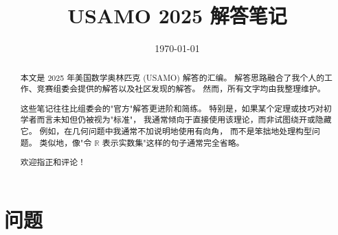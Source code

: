\documentclass[11pt]{article}
\title{USAMO 2025 解答笔记}
\author{}
\date{\today}
\theoremstyle{claimstyle}
\theoremstyle{remarkstyle}
\begin{document}
\maketitle

\begin{abstract}
本文是 2025 年美国数学奥林匹克 (USAMO) 解答的汇编。
解答思路融合了我个人的工作、竞赛组委会提供的解答以及社区发现的解答。
然而，所有文字均由我整理维护。

这些笔记往往比组委会的"官方"解答更进阶和简练。
特别是，如果某个定理或技巧对初学者而言未知但仍被视为"标准"，
我通常倾向于直接使用该理论，而非试图绕开或隐藏它。
例如，在几何问题中我通常不加说明地使用有向角，
而不是笨拙地处理构型问题。
类似地，像"令 $\mathbb{R}$ 表示实数集"这样的句子通常完全省略。

欢迎指正和评论！
\end{abstract}

\tableofcontents
\newpage

\section*{问题}
\end{document}
